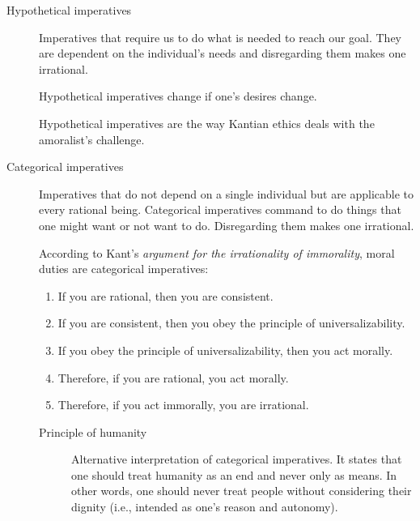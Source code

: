 \begin{description}
    \item[Hypothetical imperatives] 
        Imperatives that require us to do what is needed to reach our goal. They are dependent on the individual's needs and disregarding them makes one irrational.

        \begin{remark}
            Hypothetical imperatives change if one's desires change.
        \end{remark}

        \begin{remark}
            Hypothetical imperatives are the way Kantian ethics deals with the amoralist's challenge.
        \end{remark}

    \item[Categorical imperatives] 
        Imperatives that do not depend on a single individual but are applicable to every rational being. Categorical imperatives command to do things that one might want or not want to do. Disregarding them makes one irrational.

        \begin{remark}
            According to Kant's \textit{argument for the irrationality of immorality}, moral duties are categorical imperatives:
            \begin{enumerate}
                \item If you are rational, then you are consistent.
                \item If you are consistent, then you obey the principle of universalizability.
                \item If you obey the principle of universalizability, then you act morally.
                \item Therefore, if you are rational, you act morally.
                \item Therefore, if you act immorally, you are irrational.
            \end{enumerate}
        \end{remark}

        \begin{description}
            \item[Principle of humanity] 
                Alternative interpretation of categorical imperatives. It states that one should treat humanity as an end and never only as means. In other words, one should never treat people without considering their dignity (i.e., intended as one's reason and autonomy).
        \end{description}
\end{description}

